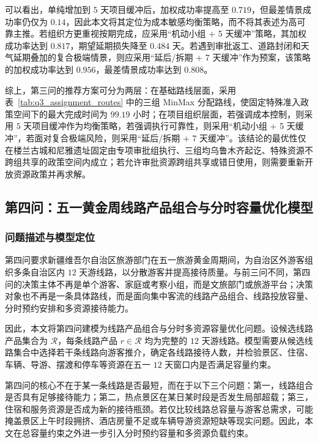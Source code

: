 \documentclass[UTF8,zihao=-4,a4paper]{ctexart}
\begin{document}
可以看出，单纯增加到 $5$ 天项目缓冲后，加权成功率提高至 $0.719$，但最差情景成功率仍仅为 $0.14$，因此本文将其定位为成本敏感均衡策略，而不将其表述为高可靠主推。若组织方更重视按期完成，应采用“机动小组 + 5 天缓冲”策略，其加权成功率达到 $0.817$，期望延期损失降至 $0.484$ 天。若遇到审批返工、道路封闭和天气延期叠加的复合极端情景，则应采用“延后/拆期 + 7 天缓冲”作为预案，该策略的加权成功率达到 $0.956$，最差情景成功率达到 $0.808$。

综上，第三问的推荐方案可分为两层：在基础路线层面，采用表~\ref{tab:q3_assignment_routes} 中的三组 MinMax 分配路线，使固定特殊准入政策空间下的最大完成时间为 $99.19$ 小时；在项目组织层面，若强调成本控制，则采用 $5$ 天项目缓冲作为均衡策略，若强调执行可靠性，则采用“机动小组 + 5 天缓冲”，若面对复合极端风险，则采用“延后/拆期 + 7 天缓冲”。该结论的最优性仅在楼兰古城和尼雅遗址固定由专项审批组执行、三组均乌鲁木齐起讫、特殊资源不跨组共享的政策空间内成立；若允许审批资源跨组共享或错日使用，则需要重新开放资源政策并再求解。

\subsection{第四问：五一黄金周线路产品组合与分时容量优化模型}
\label{subsec:q4_model}

\subsubsection{问题描述与模型定位}
\label{subsubsec:q4_problem_position}

第四问要求新疆维吾尔自治区旅游部门在五一旅游黄金周期间，为自治区外游客组织多条自治区内 $12$ 天游线路，以分散游客并提高接待质量。与前三问不同，第四问的决策主体不再是单个游客、家庭或考察小组，而是文旅部门或旅游平台；决策对象也不再是一条具体路线，而是面向集中客流的线路产品组合、线路投放容量、分时预约安排和多资源接待能力。

因此，本文将第四问建模为线路产品组合与分时多资源容量优化问题。设候选线路产品集合为 $\mathcal{R}$，每条线路产品 $r\in\mathcal{R}$ 均为完整的 $12$ 天游线路。模型需要从候选线路集合中选择若干条线路向游客推介，确定各线路接待人数，并检验景区、住宿、车辆、导游、摆渡和停车等资源在五一 $12$ 天窗口内是否满足容量约束。

第四问的核心不在于某一条线路是否最短，而在于以下三个问题：第一，线路组合是否具有足够接待能力；第二，热点景区在某日某时段是否发生局部超载；第三，住宿和服务资源是否成为新的接待瓶颈。若仅比较线路总容量与游客总需求，可能掩盖景区上午时段拥挤、酒店房量不足或车辆导游资源短缺等现实问题。因此，本文在总容量约束之外进一步引入分时预约容量和多资源负载约束。
\end{document}
